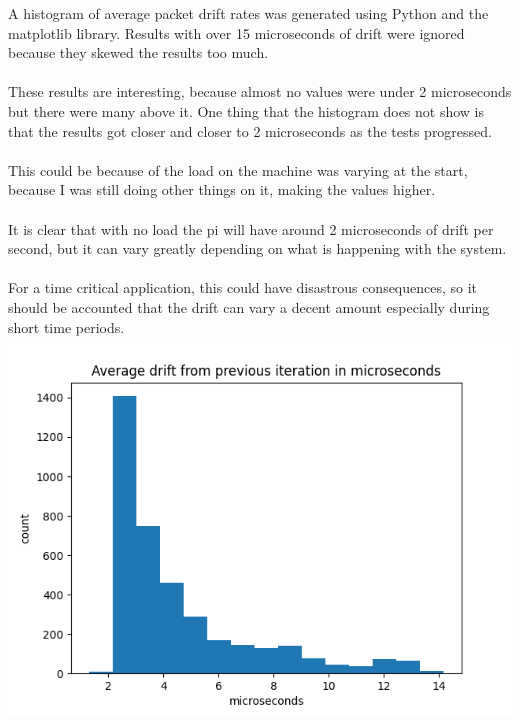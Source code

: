 \documentclass{article}
\begin{document}
A histogram of average packet drift rates was generated using Python and the matplotlib library. Results with over 15 microseconds of drift were ignored because they skewed the results too much. \\
\\
These results are interesting, because almost no values were under 2 microseconds but there were many above it. One thing that the histogram does not show is that the results got closer and closer to 2 microseconds as the tests progressed.\\
\\
This could be because of the load on the machine was varying at the start, because I was still doing other things on it, making the values higher. \\
\\
It is clear that with no load the pi will have around 2 microseconds of drift per second, but it can vary greatly depending on what is happening with the system. \\
\\
For a time critical application, this could have disastrous consequences, so it should be accounted that the drift can vary a decent amount especially during short time periods.\\
 \includegraphics[scale=0.8]{../average_drift_histo.png}                                              
 
  
  
  
\end{document}
